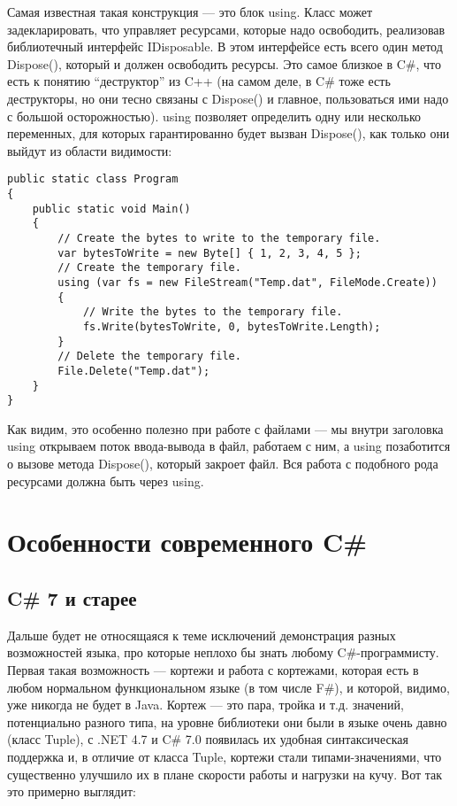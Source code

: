 \documentclass[a5paper]{article}
\begin{document}
Самая известная такая конструкция --- это блок using. Класс может задекларировать, что управляет ресурсами, которые надо освободить, реализовав библиотечный интерфейс IDisposable. В этом интерфейсе есть всего один метод Dispose(), который и должен освободить ресурсы. Это самое близкое в C\#, что есть к понятию ``деструктор'' из C++ (на самом деле, в C\# тоже есть деструкторы, но они тесно связаны с Dispose() и главное, пользоваться ими надо с большой осторожностью). using позволяет определить одну или несколько переменных, для которых гарантированно будет вызван Dispose(), как только они выйдут из области видимости:

\begin{verbatim}
public static class Program 
{
    public static void Main() 
    {
        // Create the bytes to write to the temporary file.
        var bytesToWrite = new Byte[] { 1, 2, 3, 4, 5 };
        // Create the temporary file.
        using (var fs = new FileStream("Temp.dat", FileMode.Create)) 
        {
            // Write the bytes to the temporary file.
            fs.Write(bytesToWrite, 0, bytesToWrite.Length);
        }
        // Delete the temporary file.
        File.Delete("Temp.dat");
    }
}
\end{verbatim}

Как видим, это особенно полезно при работе с файлами --- мы внутри заголовка using открываем поток ввода-вывода в файл, работаем с ним, а using позаботится о вызове метода Dispose(), который закроет файл. Вся работа с подобного рода ресурсами должна быть через using.

\section{Особенности современного C\#}

\subsection{C\# 7 и старее}

Дальше будет не относящаяся к теме исключений демонстрация разных возможностей языка, про которые неплохо бы знать любому C\#-программисту. Первая такая возможность --- кортежи и работа с кортежами, которая есть в любом нормальном функциональном языке (в том числе F\#), и которой, видимо, уже никогда не будет в Java. Кортеж --- это пара, тройка и т.д. значений, потенциально разного типа, на уровне библиотеки они были в языке очень давно (класс Tuple), с .NET 4.7 и C\# 7.0 появилась их удобная синтаксическая поддержка и, в отличие от класса Tuple, кортежи стали типами-значениями, что существенно улучшило их в плане скорости работы и нагрузки на кучу. Вот так это примерно выглядит:
\end{document}

